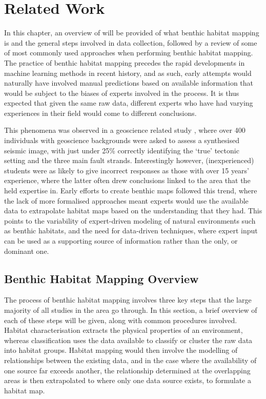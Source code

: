 \chapter{Related Work} \label{chap:relatedwork}

In this chapter, an overview of will be provided of what benthic habitat mapping is and the general steps involved in data collection, followed by a review of some of most commonly used approaches when performing benthic habitat mapping. The practice of benthic habitat mapping precedes the rapid developments in machine learning methods in recent history, and as such, early attempts would naturally have involved manual predictions based on available information that would be subject to the biases of experts involved in the process. It is thus expected that given the same raw data, different experts who have had varying experiences in their field would come to different conclusions. 

This phenomena was observed in a geoscience related study \citep{bond07}, where over 400 individuals with geoscience backgrounds were asked to assess a synthesised seismic image, with just under 25\% correctly identifying the `true' tectonic setting and the three main fault strands. Interestingly however, (inexperienced) students were as likely to give incorrect responses as those with over 15 years' experience, where the latter often drew conclusions linked to the area that the held expertise in. Early efforts to create benthic maps followed this trend, where the lack of more formalised approaches meant experts would use the available data to extrapolate habitat maps based on the understanding that they had. This points to the variability of expert-driven modeling of natural environments such as benthic habitats, and the need for data-driven techniques, where expert input can be used as a supporting source of information rather than the only, or dominant one. 

\section{Benthic Habitat Mapping Overview}

The process of benthic habitat mapping involves three key steps that the large majority of all studies in the area go through\citep{ozcoasts}. In this section, a brief overview of each of these steps will be given, along with common procedures involved. Habitat characterisation extracts the physical properties of an environment, whereas classification uses the data available to classify or cluster the raw data into habitat groups. Habitat mapping would then involve the modelling of relationships between the existing data, and in the case where the availability of one source far exceeds another, the relationship determined at the overlapping areas is then extrapolated to where only one data source exists, to formulate a habitat map.

